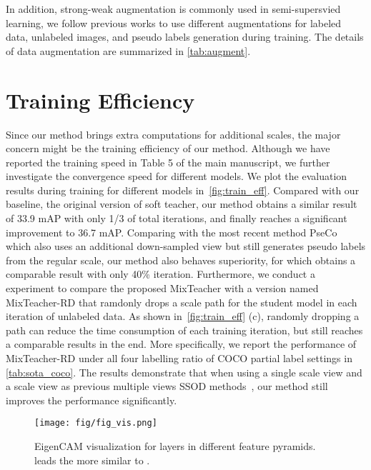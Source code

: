 \documentclass[10pt,twocolumn,letterpaper]{article}
\begin{document}
In addition, strong-weak augmentation is commonly used in semi-supersvied learning, we follow previous works to use different augmentations for labeled data, unlabeled images, and pseudo labels generation during training. The details of data augmentation are summarized in \cref{tab:augment}.



\section{Training Efficiency}


Since our method brings extra computations for additional scales, the major concern might be the training efficiency of our method. Although we have reported the training speed in Table 5 of the main manuscript, we further investigate the convergence speed for different models. We plot the evaluation results during training for different models in~\cref{fig:train_eff}. Compared with our baseline, \ie the original version of soft teacher, our method obtains a similar result of 33.9 mAP with only 1/3 of total iterations, and finally reaches a significant improvement to 36.7 mAP. Comparing with the most recent method PseCo~\cite{pseco} which also uses an additional down-sampled view but still generates pseudo labels from the regular scale, our method also behaves superiority, for which obtains a comparable result with only 40\% iteration. Furthermore, we conduct a experiment to compare the proposed MixTeacher with a version named MixTeacher-RD that ramdonly drops a  scale path for the student model in each iteration of unlabeled data. As shown in~\cref{fig:train_eff} (c), randomly dropping a path can reduce the time consumption of each training iteration, but still reaches a comparable results in the end. More specifically, we report the performance of MixTeacher-RD under all four labelling ratio of COCO partial label settings in \cref{tab:sota_coco}. The results demonstrate that when using a single  scale view and a  scale view as previous multiple views SSOD methods~\cite{sed, pseco}, our method still improves the performance significantly.

\begin{figure}[b]
  \centering
  
  \texttt{[image: fig/fig\_vis.png]}
  
   \caption{EigenCAM visualization for layers in different feature pyramids.  leads the  more similar to . }
  
   \label{fig:vis}
\end{figure}
\end{document}
